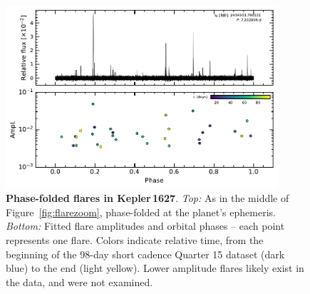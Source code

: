 \documentclass[12pt,modern,twocolumn,tighten]{aastex63}
\begin{document}
\begin{figure}[t]
	\begin{center}
		\leavevmode
		\includegraphics[width=0.9\textwidth]{f8.pdf}
	\end{center}
	\vspace{-0.7cm}
	\caption{
		{\bf Phase-folded flares in Kepler\,1627}.  
    {\it Top:}
    As in the middle of Figure~\ref{fig:flarezoom}, phase-folded at
    the planet's ephemeris.
    {\it Bottom:}
    Fitted flare amplitudes and orbital phases -- each point
    represents one flare.
    Colors indicate relative time, from the beginning of the
    98-day short cadence Quarter 15 dataset (dark blue) to the end (light
    yellow).
    Lower amplitude flares likely exist in the data, and were not
    examined.
		\label{fig:flarephase}
	}
\end{figure}
\end{document}

